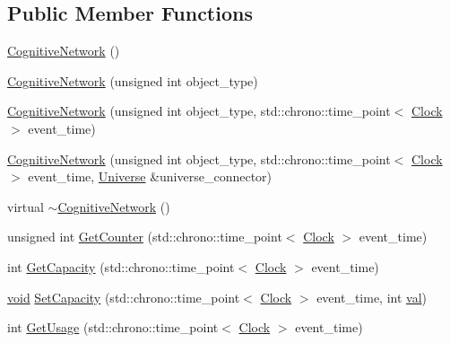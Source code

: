 \subsection*{Public Member Functions}
\begin{DoxyCompactItemize}
\item 
\mbox{\hyperlink{class_cognitive_network_a3daddb316744336648d317e7f71ed371}{Cognitive\+Network}} ()
\item 
\mbox{\hyperlink{class_cognitive_network_a167b15e33bcbca43cb0a516159e890f2}{Cognitive\+Network}} (unsigned int object\+\_\+type)
\item 
\mbox{\hyperlink{class_cognitive_network_ac7ba285d3468a929dac88756a2c4e4f9}{Cognitive\+Network}} (unsigned int object\+\_\+type, std\+::chrono\+::time\+\_\+point$<$ \mbox{\hyperlink{universe_8h_a0ef8d951d1ca5ab3cfaf7ab4c7a6fd80}{Clock}} $>$ event\+\_\+time)
\item 
\mbox{\hyperlink{class_cognitive_network_a6ec49dcc8cc58cded71983291629179c}{Cognitive\+Network}} (unsigned int object\+\_\+type, std\+::chrono\+::time\+\_\+point$<$ \mbox{\hyperlink{universe_8h_a0ef8d951d1ca5ab3cfaf7ab4c7a6fd80}{Clock}} $>$ event\+\_\+time, \mbox{\hyperlink{class_universe}{Universe}} \&universe\+\_\+connector)
\item 
virtual \mbox{\hyperlink{class_cognitive_network_a17142cc6f0bb3894e63f6c66fa401778}{$\sim$\+Cognitive\+Network}} ()
\item 
unsigned int \mbox{\hyperlink{class_cognitive_network_a160bb447671609eb14b1b8043639ac74}{Get\+Counter}} (std\+::chrono\+::time\+\_\+point$<$ \mbox{\hyperlink{universe_8h_a0ef8d951d1ca5ab3cfaf7ab4c7a6fd80}{Clock}} $>$ event\+\_\+time)
\item 
int \mbox{\hyperlink{class_cognitive_network_a6bb3fc06029c260dd658d0db072625a7}{Get\+Capacity}} (std\+::chrono\+::time\+\_\+point$<$ \mbox{\hyperlink{universe_8h_a0ef8d951d1ca5ab3cfaf7ab4c7a6fd80}{Clock}} $>$ event\+\_\+time)
\item 
\mbox{\hyperlink{glad_8h_a950fc91edb4504f62f1c577bf4727c29}{void}} \mbox{\hyperlink{class_cognitive_network_a055b3711835b8d134356298f8975f04d}{Set\+Capacity}} (std\+::chrono\+::time\+\_\+point$<$ \mbox{\hyperlink{universe_8h_a0ef8d951d1ca5ab3cfaf7ab4c7a6fd80}{Clock}} $>$ event\+\_\+time, int \mbox{\hyperlink{glad_8h_a26942fd2ed566ef553eae82d2c109c8f}{val}})
\item 
int \mbox{\hyperlink{class_cognitive_network_ad293916cfa0e454ef40d7e228d0dcba3}{Get\+Usage}} (std\+::chrono\+::time\+\_\+point$<$ \mbox{\hyperlink{universe_8h_a0ef8d951d1ca5ab3cfaf7ab4c7a6fd80}{Clock}} $>$ event\+\_\+time)

\end{DoxyCompactItemize}
